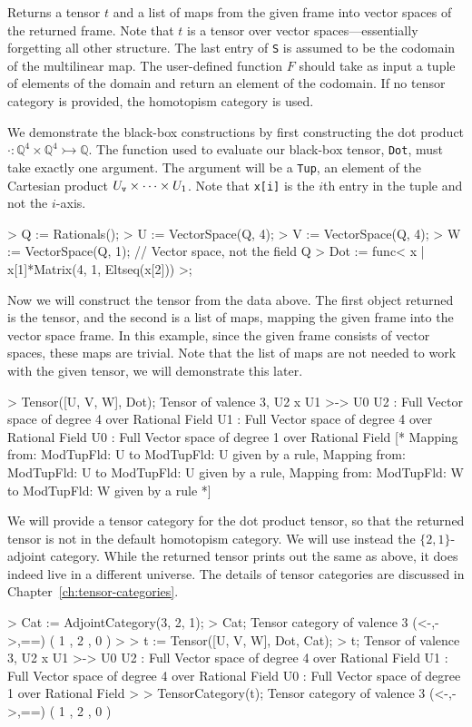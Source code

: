 Returns a tensor $t$ and a list of maps from the given frame into vector spaces
of the returned frame. Note that $t$ is a tensor over vector
spaces---essentially forgetting all other structure. The last entry of
\texttt{S} is assumed to be the codomain of the multilinear map. The
user-defined function $F$ should take as input a tuple of elements of the domain
and return an element of the codomain. If no tensor category is provided, the
homotopism category is used.

\begin{example}[BBTensorsFrame] We demonstrate the black-box constructions by
first constructing the dot product $\cdot : \mathbb{Q}^4\times
\mathbb{Q}^4\rightarrowtail \mathbb{Q}$. The function used to evaluate our
black-box tensor, \texttt{Dot}, must take exactly one argument. The argument
will be a \texttt{Tup}, an element of the Cartesian product $U_{\operatorname{\mathtt{v}}}\times
\cdots\times U_1$. Note that \texttt{x[i]} is the $i$th entry in the tuple and
not the $i$-axis.
\begin{code}
> Q := Rationals();
> U := VectorSpace(Q, 4);
> V := VectorSpace(Q, 4);
> W := VectorSpace(Q, 1);  // Vector space, not the field Q
> Dot := func< x | x[1]*Matrix(4, 1, Eltseq(x[2])) >;
\end{code}

Now we will construct the tensor from the data above. The first object returned
is the tensor, and the second is a list of maps, mapping the given frame into
the vector space frame. In this example, since the given frame consists of
vector spaces, these maps are trivial. Note that the list of maps are not needed
to work with the given tensor, we will demonstrate this later. 
\begin{code}
> Tensor([U, V, W], Dot);
Tensor of valence 3, U2 x U1 >-> U0
U2 : Full Vector space of degree 4 over Rational Field
U1 : Full Vector space of degree 4 over Rational Field
U0 : Full Vector space of degree 1 over Rational Field
[*
    Mapping from: ModTupFld: U to ModTupFld: U given by a rule,
    Mapping from: ModTupFld: U to ModTupFld: U given by a rule,
    Mapping from: ModTupFld: W to ModTupFld: W given by a rule
*]
\end{code}

We will provide a tensor category for the dot product tensor, so that the
returned tensor is not in the default homotopism category. We will use instead
the $\{2,1\}$-adjoint category. While the returned tensor prints out the same as
above, it does indeed live in a different universe. The details of tensor
categories are discussed in Chapter~\ref{ch:tensor-categories}.
\begin{code}
> Cat := AdjointCategory(3, 2, 1);
> Cat;
Tensor category of valence 3 (<-,->,==) ({ 1 },{ 2 },{ 0 })
> 
> t := Tensor([U, V, W], Dot, Cat);
> t;
Tensor of valence 3, U2 x U1 >-> U0
U2 : Full Vector space of degree 4 over Rational Field
U1 : Full Vector space of degree 4 over Rational Field
U0 : Full Vector space of degree 1 over Rational Field
> 
> TensorCategory(t);
Tensor category of valence 3 (<-,->,==) ({ 1 },{ 2 },{ 0 })
\end{code}
\end{example}

